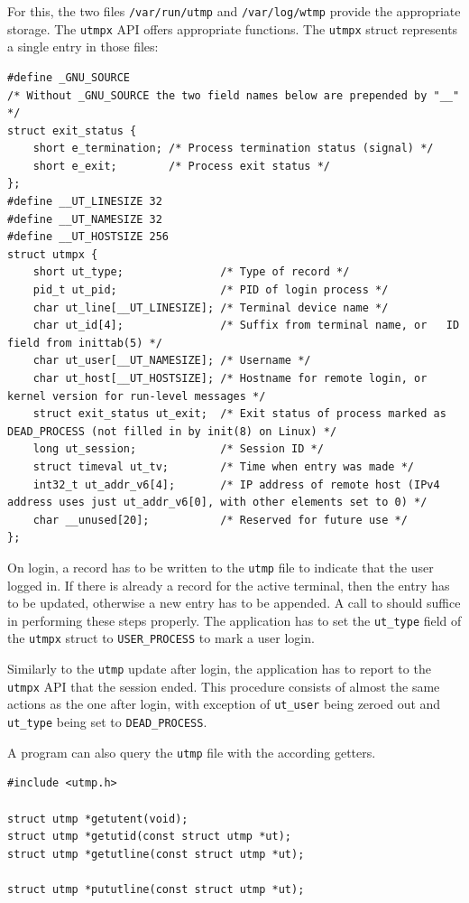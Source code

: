 \documentclass[10pt,a4paper,titlepage,twoside,english,final]{zhawreprt}
\begin{document}
For this, the two files \texttt{/var/run/utmp} and \texttt{/var/log/wtmp} provide the appropriate storage.
The \texttt{utmpx} \gls{API} offers appropriate functions.
The \texttt{utmpx} struct represents a single entry in those files:
\setlistingC
\begin{lstlisting}[caption={Definition of the utmpx structure {\citep[p.819]{KerriskTLPI}}},label=lst:UtmpxDefinition]
#define _GNU_SOURCE
/* Without _GNU_SOURCE the two field names below are prepended by "__" */
struct exit_status {
	short e_termination; /* Process termination status (signal) */
	short e_exit; 		 /* Process exit status */
};
#define __UT_LINESIZE 32
#define __UT_NAMESIZE 32
#define __UT_HOSTSIZE 256
struct utmpx {
	short ut_type; 				 /* Type of record */
	pid_t ut_pid; 				 /* PID of login process */
	char ut_line[__UT_LINESIZE]; /* Terminal device name */
	char ut_id[4]; 				 /* Suffix from terminal name, or	ID field from inittab(5) */
	char ut_user[__UT_NAMESIZE]; /* Username */
	char ut_host[__UT_HOSTSIZE]; /* Hostname for remote login, or kernel version for run-level messages */
	struct exit_status ut_exit;  /* Exit status of process marked as DEAD_PROCESS (not filled in by init(8) on Linux) */
	long ut_session; 			 /* Session ID */
	struct timeval ut_tv; 		 /* Time when entry was made */
	int32_t ut_addr_v6[4]; 		 /* IP address of remote host (IPv4 address uses just ut_addr_v6[0], with other elements set to 0) */
	char __unused[20]; 			 /* Reserved for future use */
};
\end{lstlisting}

On login, a record has to be written to the \texttt{utmp} file to indicate that the user logged in.
If there is already a record for the active \gls{terminal}, then the entry has to be updated, otherwise a new entry has to be appended.
A call to \cite{pututxline} should suffice in performing these steps properly.
The application has to set the \texttt{ut\_type} field of the \texttt{utmpx} struct to \texttt{USER\_PROCESS} to mark a user login.

Similarly to the \texttt{utmp} update after login, the application has to report to the \texttt{utmpx} \gls{API} that the session ended.
This procedure consists of almost the same actions as the one after login, with exception of \texttt{ut\_user} being zeroed out and \texttt{ut\_type} being set to \texttt{DEAD\_PROCESS}\citep[p.828]{KerriskTLPI}.

A program can also query the \texttt{utmp} file with the according getters.
\setlistingC
\begin{lstlisting}[caption={\texttt{utmpx} \gls{API} functions},label=lst:UtmpxApiFunctions]
#include <utmp.h>

struct utmp *getutent(void);
struct utmp *getutid(const struct utmp *ut);
struct utmp *getutline(const struct utmp *ut);

struct utmp *pututline(const struct utmp *ut);
\end{lstlisting}
\end{document}
